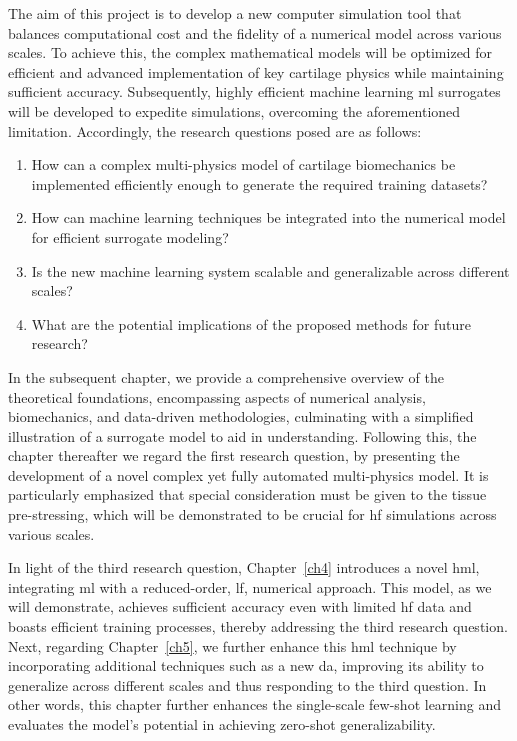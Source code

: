 \documentclass[12pt,a4paper]{report}
\begin{document}
The aim of this project is to develop a new computer simulation tool that balances computational cost and the fidelity of a numerical model across various scales. To achieve this, the complex mathematical models will be optimized for efficient and advanced implementation of key cartilage physics while maintaining sufficient accuracy. Subsequently, highly efficient machine learning \ac{ml} surrogates will be developed to expedite simulations, overcoming the aforementioned limitation. Accordingly, the research questions posed are as follows:
%
\begin{enumerate}
    \item How can a complex multi-physics model of cartilage biomechanics be implemented efficiently enough to generate the required training datasets?
    \item How can machine learning techniques be integrated into the numerical model for efficient surrogate modeling?
    \item Is the new machine learning system scalable and generalizable across different scales?
    \item What are the potential implications of the proposed methods for future research?
\end{enumerate}

In the subsequent chapter, we provide a comprehensive overview of the theoretical foundations, encompassing aspects of numerical analysis, biomechanics, and data-driven methodologies, culminating with a simplified illustration of a surrogate model to aid in understanding. Following this, the chapter thereafter we regard the first research question, by presenting the development of a novel complex yet fully automated multi-physics model. It is particularly emphasized that special consideration must be given to the tissue pre-stressing, which will be demonstrated to be crucial for \ac{hf} simulations across various scales.

In light of the third research question, Chapter~\ref{ch4} introduces a novel \ac{hml}, integrating \ac{ml} with a reduced-order, \ac{lf}, numerical approach. This model, as we will demonstrate, achieves sufficient accuracy even with limited \ac{hf} data and boasts efficient training processes, thereby addressing the third research question. Next, regarding Chapter~\ref{ch5}, we further enhance this \ac{hml} technique by incorporating additional techniques such as a new \ac{da}, improving its ability to generalize across different scales and thus responding to the third question. In other words, this chapter further enhances the single-scale few-shot learning and evaluates the model's potential in achieving zero-shot generalizability.
\end{document}

